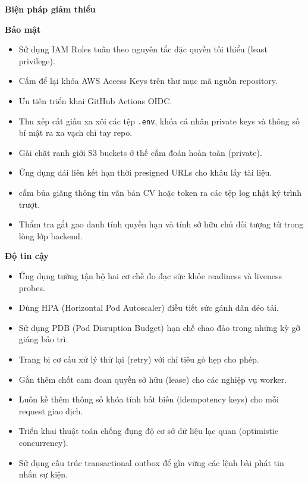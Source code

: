 \vspace{0.5em}\noindent\textbf{Biện pháp giảm
thiểu}\par

\textbf{Bảo mật}

\begin{itemize}
\tightlist
\item
  Sử dụng IAM Roles tuân theo nguyên tắc đặc quyền tối thiểu (least
  privilege).
\item
  Cấm để lại khóa AWS Access Keys trên thư mục mã nguồn repository.
\item
  Ưu tiên triển khai GitHub Actions OIDC.
\item
  Thu xếp cất giấu xa xôi các tệp \texttt{.\allowbreak{}env}, khóa cá nhân private
  keys và thông số bí mật ra xa vạch chỉ tay repo.
\item
  Gài chặt ranh giới S3 buckets ở thế cấm đoán hoàn toàn (private).
\item
  Ứng dụng dải liên kết hạn thời presigned URLs cho khâu lấy tài liệu.
\item
  cấm bủa giăng thông tin văn bản CV hoặc token ra các tệp log nhật ký
  trình trượt.
\item
  Thẩm tra gắt gao danh tính quyền hạn và tính sở hữu chủ đối tượng từ
  trong lòng lớp backend.
\end{itemize}

\textbf{Độ tin cậy}

\begin{itemize}
\tightlist
\item
  Ứng dụng tường tận bộ hai cơ chế đo đạc sức khỏe readiness và liveness
  probes.
\item
  Dùng HPA (Horizontal Pod Autoscaler) điều tiết sức gánh dãn dẻo tải.
\item
  Sử dụng PDB (Pod Disruption Budget) hạn chế chao đảo trong những kỳ gỡ
  giáng bảo trì.
\item
  Trang bị cơ cấu xử lý thử lại (retry) với chỉ tiêu gò hẹp cho phép.
\item
  Gắn thêm chốt cam đoan quyền sở hữu (lease) cho các nghiệp vụ worker.
\item
  Luôn kề thêm thông số khóa tính bất biến (idempotency keys) cho mỗi
  request giao dịch.
\item
  Triển khai thuật toán chống đụng độ cơ sở dữ liệu lạc quan (optimistic
  concurrency).
\item
  Sử dụng cấu trúc transactional outbox để gìn vững các lệnh bài phát
  tin nhắn sự kiện.
\end{itemize}

